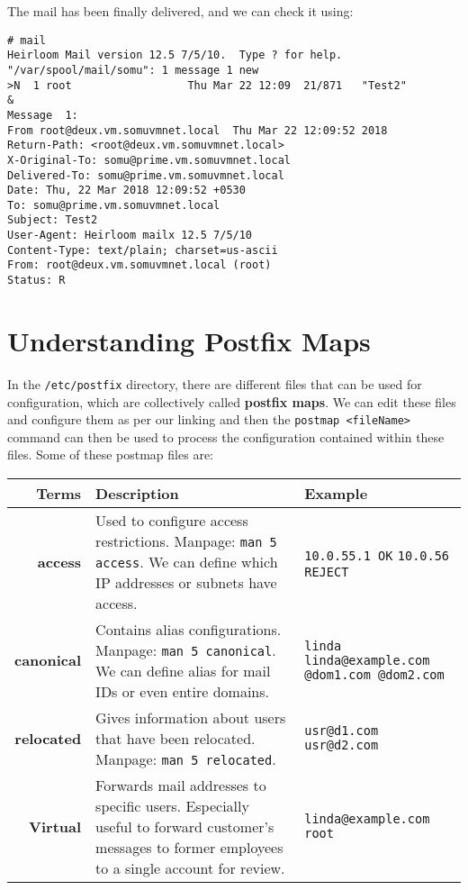\noindent
The mail has been finally delivered, and we can check it using:

\vspace{-15pt}
\begin{verbatim}
# mail
Heirloom Mail version 12.5 7/5/10.  Type ? for help.
"/var/spool/mail/somu": 1 message 1 new
>N  1 root                  Thu Mar 22 12:09  21/871   "Test2"
& 
Message  1:
From root@deux.vm.somuvmnet.local  Thu Mar 22 12:09:52 2018
Return-Path: <root@deux.vm.somuvmnet.local>
X-Original-To: somu@prime.vm.somuvmnet.local
Delivered-To: somu@prime.vm.somuvmnet.local
Date: Thu, 22 Mar 2018 12:09:52 +0530
To: somu@prime.vm.somuvmnet.local
Subject: Test2
User-Agent: Heirloom mailx 12.5 7/5/10
Content-Type: text/plain; charset=us-ascii
From: root@deux.vm.somuvmnet.local (root)
Status: R
\end{verbatim}
\vspace{-10pt}	

	\section{Understanding Postfix Maps}
In the \verb|/etc/postfix| directory, there are different files that can be used for configuration, which are collectively called \textbf{postfix maps}. We can edit these files and configure them as per our linking and then the \verb|postmap <fileName>| command can then be used to process the configuration contained within these files. Some of these postmap files are:

\noindent
\begin{tabular}{rM{0.53}M{0.3}}
	\toprule
	\textbf{Terms} &\textbf{Description} &\textbf{Example}\\
	\midrule
	\textbf{access}	&Used to configure access restrictions. Manpage: \verb|man 5 access|. We can define which IP addresses or subnets have access.	&\verb|10.0.55.1 OK| \verb|10.0.56   REJECT|\\
	\midrule
	\textbf{canonical}	&Contains alias configurations. Manpage: \verb|man 5 canonical|.	We can define alias for mail IDs or even entire domains. &\verb|linda linda@example.com| \verb|@dom1.com @dom2.com|\\
	\midrule
	\textbf{relocated}	&Gives information about users that have been relocated. Manpage: \verb|man 5 relocated|.	&\verb|usr@d1.com usr@d2.com|\\
	\midrule
	\textbf{Virtual}	&Forwards mail addresses to specific users. Especially useful to forward customer's messages to former employees to a single account for review. 	&\verb|linda@example.com root|\\
	\bottomrule
\end{tabular}